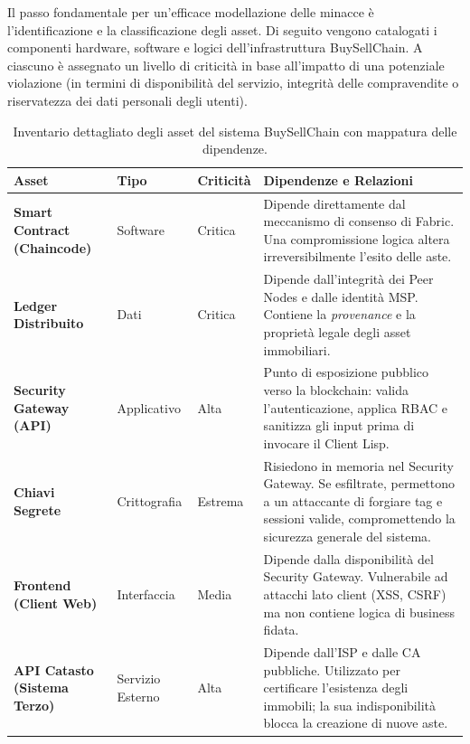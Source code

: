 Il passo fondamentale per un'efficace modellazione delle minacce è l'identificazione e la classificazione degli asset. Di seguito vengono catalogati i componenti hardware, software e logici dell'infrastruttura BuySellChain. A ciascuno è assegnato un livello di criticità in base all'impatto di una potenziale violazione (in termini di disponibilità del servizio, integrità delle compravendite o riservatezza dei dati personali degli utenti).

\begin{table}[h]
\centering
\footnotesize
\renewcommand{\arraystretch}{1.4}
\begin{tabularx}{\textwidth}{>{\bfseries}p{2.8cm} p{2cm} p{1.6cm} X}
\toprule
\textbf{Asset} & \textbf{Tipo} & \textbf{Criticità} & \textbf{Dipendenze e Relazioni} \\
\midrule
Smart Contract (Chaincode) & Software & Critica &
    Dipende direttamente dal meccanismo di consenso di Fabric. Una compromissione logica
    altera irreversibilmente l'esito delle aste. \\[4pt]
Ledger Distribuito & Dati & Critica &
    Dipende dall'integrità dei Peer Nodes e dalle identità MSP. Contiene la \textit{provenance}
    e la proprietà legale degli asset immobiliari. \\[4pt]
Security Gateway (API) & Applicativo & Alta &
    Punto di esposizione pubblico verso la blockchain: valida l'autenticazione, applica RBAC
    e sanitizza gli input prima di invocare il Client Lisp. \\[4pt]
Chiavi Segrete & Crittografia & Estrema &
    Risiedono in memoria nel Security Gateway. Se esfiltrate, permettono a un attaccante di
    forgiare tag e sessioni valide, compromettendo la sicurezza generale del sistema. \\[4pt]
Frontend (Client Web) & Interfaccia & Media &
    Dipende dalla disponibilità del Security Gateway. Vulnerabile ad attacchi lato client
    (XSS, CSRF) ma non contiene logica di business fidata. \\[4pt]
API Catasto (Sistema Terzo) & Servizio Esterno & Alta &
    Dipende dall'ISP e dalle CA pubbliche. Utilizzato per certificare l'esistenza degli
    immobili; la sua indisponibilità blocca la creazione di nuove aste. \\
\bottomrule
\end{tabularx}
\caption{Inventario dettagliato degli asset del sistema BuySellChain con mappatura delle dipendenze.}
\label{tab:asset-inventory}
\end{table}

